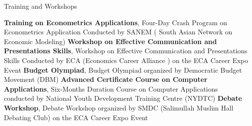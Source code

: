 \begin{rubric}{Training and Workshops}

\entry*[2022] \textbf{Training on Econometrics Applications}, Four-Day Crash Program on  Econometrics Application Conducted by SANEM ( South Asian Network on Economic Modeling) 
%
\entry*[2020] \textbf{Workshop on Effective Communication and Presentations Skills}, Workshop on Effective Communication and Presentations Skills Conducted by ECA (Economics Career Alliance ) on the ECA Career Expo Event
\entry*[2019] \textbf{Budget Olympiad}, Budget Olympiad organized by Democratic Budget Movement (DBM) 
\entry*[2018] \textbf{Advanced Certificate Course on Computer Applications}, Six-Months Duration Course on Computer Applications conducted by National Youth Development Training Centre (NYDTC)
\entry*[2018] \textbf{Debate Workshop}, Debate Workshop organized by SMDC (Salimullah Muslim Hall Debating Club) on the ECA Career Expo Event
\end{rubric}